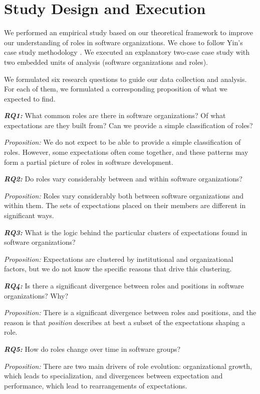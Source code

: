 \documentclass[10pt, conference, compsocconf]{IEEEtran}
\begin{document}

\section{Study Design and Execution}

We performed an empirical study based on our theoretical framework to improve our understanding of roles in software organizations. We chose to follow Yin's case study methodology \cite{Yin2003}. We executed an explanatory two-case case study with two embedded units of analysis (software organizations and roles).

We formulated six research questions to guide our data collection and analysis. For each of them, we formulated a corresponding proposition of what we expected to find.

\textbf{\emph{RQ1:}} What common roles are there in software organizations? Of what expectations are they built from? Can we provide a simple classification of roles?

\emph{Proposition:} We do not expect to be able to provide a simple classification of roles. However, some expectations often come together, and these patterns may form a partial picture of roles in software development.

\textbf{\emph{RQ2:}} Do roles vary considerably between and within software organizations?

\emph{Proposition:} Roles vary considerably both between software organizations and within them. The sets of expectations placed on their members are different in significant ways.

\textbf{\emph{RQ3:}} What is the logic behind the particular clusters of expectations found in software organizations?

\emph{Proposition:} Expectations are clustered by institutional and organizational factors, but we do not know the specific reasons that drive this clustering.

\textbf{\emph{RQ4:}} Is there a significant divergence between roles and positions in software organizations? Why?

\emph{Proposition:} There is a significant divergence between roles and positions, and the reason is that \emph{position} describes at best a subset of the expectations shaping a role.

\textbf{\emph{RQ5:}} How do roles change over time in software groups?

\emph{Proposition:} There are two main drivers of role evolution: organizational growth, which leads to specialization, and divergences between expectation and performance, which lead to rearrangements of expectations.
\end{document}
